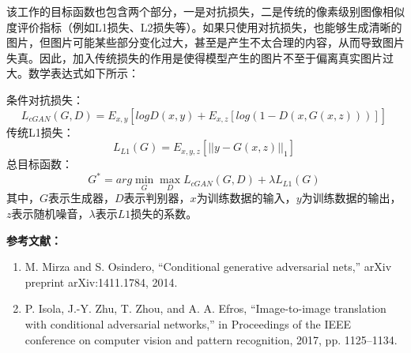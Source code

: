 该工作的目标函数也包含两个部分，一是对抗损失，二是传统的像素级别图像相似度评价指标（例如L1损失、L2损失等）。如果只使用对抗损失，也能够生成清晰的图片，但图片可能某些部分变化过大，甚至是产生不太合理的内容，从而导致图片失真。因此，加入传统损失的作用是使得模型产生的图片不至于偏离真实图片过大。数学表达式如下所示：

条件对抗损失：
\begin{equation}
L_{cGAN}(G,D)=E_{x,y}[logD(x,y)+E_{x,z}[log(1-D(x,G(x,z)))]]~
\end{equation}
传统L1损失：
\begin{equation}
L_{L1}(G)=E_{x,y,z}[||y-G(x,z)||_1] ~
\end{equation}
总目标函数：
\begin{equation}
G^*=arg \mathop{min}\limits_G \mathop{max}\limits_D L_{cGAN}(G,D)+\lambda L_{L1}(G) ~
\end{equation}
其中，$G$表示生成器，$D$表示判别器，$x$为训练数据的输入，$y$为训练数据的输出，$z$表示随机噪音，$\lambda$表示$L1$损失的系数。

\textbf{参考文献：}
\begin{enumerate}
\item M. Mirza and S. Osindero, “Conditional generative adversarial nets,” arXiv preprint arXiv:1411.1784, 2014.
\item P. Isola, J.-Y. Zhu, T. Zhou, and A. A. Efros, “Image-to-image translation with conditional adversarial networks,” in Proceedings of the IEEE conference on computer vision and pattern recognition, 2017, pp. 1125–1134.
\end{enumerate}
